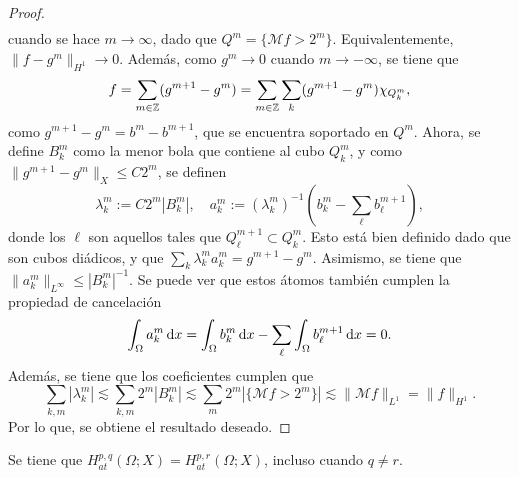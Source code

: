 \begin{proof}
\begin{align*}
	\end{align*}
	cuando se hace $m\to\infty$, dado que $Q^m = \{\mathcal{M}f>2^m\}$. Equivalentemente, $\|f-g^m\|_{H^1} \to 0$. Además, como $g^m\to0$ cuando $m\to-\infty$, se tiene que 
	\begin{equation*}
		f = \sum_{m\in\mathbb{Z}} (g^{m+1}-g^m) = \sum_{m\in\mathbb{Z}}\sum_k (g^{m+1}-g^m)\chi_{Q_k^m},
	\end{equation*}
	como $g^{m+1}-g^m = b^m - b^{m+1}$, que se encuentra soportado en $Q^m$. Ahora, se define $B_k^m$ como la menor bola que contiene al cubo $Q_k^m$, y como $\|g^{m+1}-g^{m}\|_X \leq C2^{m}$, se definen
	\begin{equation*}
		\lambda_k^m := C 2^m |B_k^m|, \quad a_k^m := (\lambda_k^m)^{-1} \left(b_k^m - \sum_\ell b_\ell^{m+1}\right),
	\end{equation*}
	donde los $\ell$ son aquellos tales que $Q_\ell^{m+1}\subset Q_k^m$. Esto está bien definido dado que son cubos diádicos, y que $\sum_k \lambda_k^ma_k^m = g^{m+1}-g^m$. Asimismo, se tiene que $\|a_k^m\|_{L^\infty} \leq |B_k^m|^{-1}$. Se puede ver que estos átomos también cumplen la propiedad de cancelación
	\begin{equation*}
		\int_{\Omega}a_k^m \mathop{}\!\mathrm{d} x = \int_{\Omega} b_k^m \mathop{}\!\mathrm{d} x -\sum_\ell  \int_{\Omega} b^{m+1}_\ell\mathop{}\!\mathrm{d} x = 0.
	\end{equation*}
	Además, se tiene que los coeficientes cumplen que 
	\begin{equation*}
		\sum_{k,m} |\lambda_k^m|  \lesssim \sum_{k,m} 2^m|B_k^m| \lesssim \sum_m 2^m|\{\mathcal{M}f>2^m\}|  \lesssim \| \mathcal{M}f\|_{L^1} = \|f\|_{H^1}.
	\end{equation*}
	Por lo que, se obtiene el resultado deseado.
\end{proof}
\begin{theorem}
	Se tiene que $H^{p,q}_{at}(\Omega;X) = H^{p,r}_{at}(\Omega;X)$, incluso cuando $q\neq r$.
\end{theorem}
